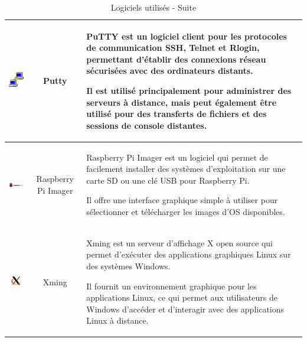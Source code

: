 \begin{table}[H]
\begin{center}
\begin{tabular}{|c{3cm}|c{3cm}|l{10cm}|}
\hline
\includegraphics[width=3cm]{Images/Logo-Putty.png} & Putty & PuTTY est un logiciel client pour les protocoles de communication SSH, Telnet et Rlogin, permettant d'établir des connexions réseau sécurisées avec des ordinateurs distants. 

Il est utilisé principalement pour administrer des serveurs à distance, mais peut également être utilisé pour des transferts de fichiers et des sessions de console distantes. \\
\hline
\includegraphics[width=3cm]{Images/Logo-Raspberry.png} & Raspberry Pi Imager & Raspberry Pi Imager est un logiciel qui permet de facilement installer des systèmes d'exploitation sur une carte SD ou une clé USB pour Raspberry Pi. 

Il offre une interface graphique simple à utiliser pour sélectionner et télécharger les images d'OS disponibles. \\
\hline
\includegraphics[width=3cm]{Images/xminglogo.png} & Xming & Xming est un serveur d'affichage X open source qui permet d'exécuter des applications graphiques Linux sur des systèmes Windows. 

Il fournit un environnement graphique pour les applications Linux, ce qui permet aux utilisateurs de Windows d'accéder et d'interagir avec des applications Linux à distance. \\
\hline
\end{tabular}
\caption{Logiciels utilisés - Suite}
\label{3}
\end{center}
\end{table}




